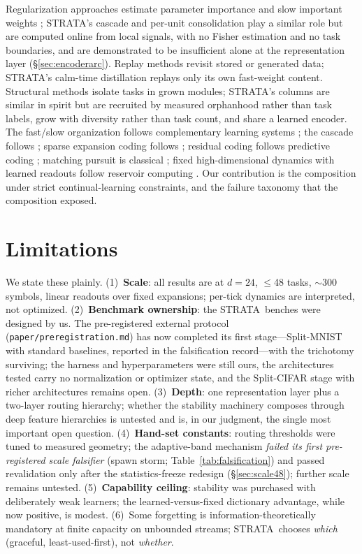 \documentclass[11pt]{article}
\newcommand{\strata}{STRATA}
\newcommand{\code}[1]{\texttt{#1}}
\begin{document}
Regularization approaches estimate parameter importance and slow important
weights \cite{kirkpatrick2017,zenke2017}; \strata's cascade and per-unit
consolidation play a similar role but are computed online from local
signals, with no Fisher estimation and no task boundaries, and are
demonstrated to be insufficient alone at the representation layer
(\S\ref{sec:encoderarc}). Replay methods \cite{shin2017} revisit stored or
generated data; \strata's calm-time distillation replays only its own
fast-weight content. Structural methods \cite{rusu2016} isolate tasks in
grown modules; \strata's columns are similar in spirit but are recruited by
measured orphanhood rather than task labels, grow with diversity rather
than task count, and share a learned encoder. The fast/slow organization
follows complementary learning systems \cite{mcclelland1995}; the cascade
follows \cite{fusi2005,benna2016}; sparse expansion coding follows
\cite{olshausen1996,dasgupta2017}; residual coding follows predictive
coding \cite{rao1999}; matching pursuit is classical \cite{mallat1993};
fixed high-dimensional dynamics with learned readouts follow reservoir
computing \cite{maass2002,jaeger2001}. Our contribution is the
composition under strict continual-learning constraints, and the failure
taxonomy that the composition exposed.

\section{Limitations}
\label{sec:limitations}

We state these plainly. (1)~\textbf{Scale}: all results are at $d{=}24$,
$\le$48 tasks, $\sim$300 symbols, linear readouts over fixed expansions;
per-tick dynamics are interpreted, not optimized. (2)~\textbf{Benchmark
ownership}: the \strata\ benches were designed by us. The pre-registered
external protocol (\code{paper/preregistration.md}) has now completed its
first stage---Split-MNIST with standard baselines, reported in the
falsification record---with the trichotomy surviving; the harness and
hyperparameters were still ours, the architectures tested carry no
normalization or optimizer state, and the Split-CIFAR stage with richer
architectures remains open.
(3)~\textbf{Depth}: one representation layer plus a two-layer routing
hierarchy; whether the stability machinery composes through deep feature
hierarchies is untested and is, in our judgment, the single most important
open question. (4)~\textbf{Hand-set constants}: routing thresholds were
tuned to measured geometry; the adaptive-band mechanism \emph{failed its
first pre-registered scale falsifier} (spawn storm;
Table~\ref{tab:falsification}) and passed revalidation only after the
statistics-freeze redesign (\S\ref{sec:scale48}); further scale remains
untested. (5)~\textbf{Capability
ceiling}: stability was purchased with deliberately weak learners; the
learned-versus-fixed dictionary advantage, while now positive, is modest.
(6)~Some forgetting is information-theoretically mandatory at finite
capacity on unbounded streams; \strata\ chooses \emph{which} (graceful,
least-used-first), not \emph{whether}.
\end{document}
